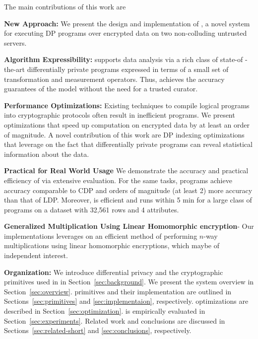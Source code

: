 The main contributions of this work are
\squishlist
\item \textbf{New Approach:} We present the design and implementation of \system, a novel system for executing DP programs over encrypted data on two non-colluding untrusted servers. %
\item \textbf{Algorithm Expressibility:} \system supports data analysis via a rich class of state-of -the-art differentially private programs expressed in terms of a small set of transformation and measurement operators. Thus, \system achieves the accuracy guarantees of the \cdp model without the need for a trusted curator.  
\item \textbf{Performance Optimizations:} Existing techniques to compile logical \system programs into cryptographic protocols often result in inefficient programs. We present optimizations that speed up computation on encrypted data by at least an order of magnitude. A novel contribution of this work are DP indexing optimizations that leverage on the fact that differentially private programs can reveal statistical information about the data. 
\item \textbf{Practical for Real World Usage} We demonstrate the accuracy and practical efficiency of \system via extensive  evaluation. For the same tasks, \system programs achieve accuracy comparable to \textsf{CDP} and orders of magnitude (at least 2) more accuracy than that of \textsf{LDP}. Moreover, \system is efficient and runs within 5 min for a large class of programs on a dataset with 32,561 rows and 4 attributes. 
\item \textbf{Generalized Multiplication Using Linear Homomorphic encryption}- Our implementations leverages on an efficient method of performing $n$-way multiplications using linear homomorphic encryptions, which maybe of independent interest.
\squishend


\noindent\textbf{Organization:} We introduce differential privacy and the cryptographic primitives used in \system in Section~\ref{sec:background}. We present the system overview in Section~\ref{sec:overview}. \system primitives and their implementation are outlined in Sections~\ref{sec:primitives} and \ref{sec:implementaion}, respectively. \system optimizations  are described in Section~\ref{sec:optimization}. \system is empirically evaluated in Section~\ref{sec:experiments}. Related work and conclusions are discussed in Sections~\ref{sec:related-short} and \ref{sec:conclusions}, respectively.

